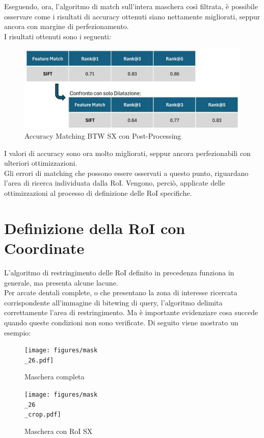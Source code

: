 \documentclass[12pt,a4paper,openright,twoside]{book}
\begin{document}
Eseguendo, ora, l'algoritmo di match sull'intera maschera così filtrata, è possibile osservare come i risultati di accuracy ottenuti siano nettamente migliorati, seppur ancora con margine di perfezionamento. \\
I risultati ottenuti sono i seguenti:
\begin{figure}[H]
	\centering
	\includegraphics{figures/sx7_1.pdf}
    	\caption{Accuracy Matching BTW SX con Post-Processing}
	\label{fig:sx6}
\end{figure}
I valori di accuracy sono ora molto migliorati, seppur ancora perfezionabili con ulteriori ottimizzazioni. \\
Gli errori di matching che possono essere osservati a questo punto, riguardano l'area di ricerca individuata dalla RoI. Vengono, perciò, applicate delle ottimizzazioni al processo di definizione delle RoI specifiche.

\section{Definizione della RoI con Coordinate}
L'algoritmo di restringimento delle RoI definito in precedenza funziona in generale, ma presenta alcune lacune.\\
Per arcate dentali complete, o che presentano la zona di interesse ricercata corrispondente all'immagine di bitewing di query, l'algoritmo delimita correttamente l'area di restringimento. %
Ma è importante evidenziare cosa succede quando queste condizioni non sono verificate. Di seguito viene mostrato un esempio:
\begin{figure}[H]
    \centering
    \begin{minipage}{0.45\textwidth}
	\centering
    	\texttt{[image: figures/mask\\\_26.pdf]}
    	\caption{Maschera completa}
    	\label{lab:Maschera completa}
    \end{minipage}\hfill
    \begin{minipage}{0.45\textwidth}
    	\centering
    	\texttt{[image: figures/mask\\\_26\\\_crop.pdf]}
    	\caption{Maschera con RoI SX}
    	\label{lab:Maschera con RoI sx}
    \end{minipage}\hfill
\end{figure}
 
\end{document}
